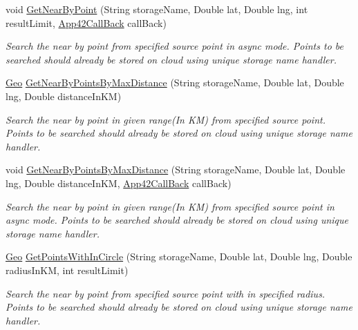 \begin{DoxyCompactItemize}
void \hyperlink{classcom_1_1shephertz_1_1app42_1_1paas_1_1sdk_1_1csharp_1_1geo_1_1_geo_service_ab7110e080306922cc589d7c8451874aa}{Get\+Near\+By\+Point} (String storage\+Name, Double lat, Double lng, int result\+Limit, \hyperlink{interfacecom_1_1shephertz_1_1app42_1_1paas_1_1sdk_1_1csharp_1_1_app42_call_back}{App42\+Call\+Back} call\+Back)
\begin{DoxyCompactList}\small\item\em Search the near by point from specified source point in async mode. Points to be searched should already be stored on cloud using unique storage name handler. \end{DoxyCompactList}\item 
\hyperlink{classcom_1_1shephertz_1_1app42_1_1paas_1_1sdk_1_1csharp_1_1geo_1_1_geo}{Geo} \hyperlink{classcom_1_1shephertz_1_1app42_1_1paas_1_1sdk_1_1csharp_1_1geo_1_1_geo_service_a678117e4463bddada386741ff4a87d2f}{Get\+Near\+By\+Points\+By\+Max\+Distance} (String storage\+Name, Double lat, Double lng, Double distance\+In\+K\+M)
\begin{DoxyCompactList}\small\item\em Search the near by point in given range(\+In K\+M) from specified source point. Points to be searched should already be stored on cloud using unique storage name handler. \end{DoxyCompactList}\item 
void \hyperlink{classcom_1_1shephertz_1_1app42_1_1paas_1_1sdk_1_1csharp_1_1geo_1_1_geo_service_aa7efc8336dabcd57f921793ebff2311f}{Get\+Near\+By\+Points\+By\+Max\+Distance} (String storage\+Name, Double lat, Double lng, Double distance\+In\+K\+M, \hyperlink{interfacecom_1_1shephertz_1_1app42_1_1paas_1_1sdk_1_1csharp_1_1_app42_call_back}{App42\+Call\+Back} call\+Back)
\begin{DoxyCompactList}\small\item\em Search the near by point in given range(\+In K\+M) from specified source point in async mode. Points to be searched should already be stored on cloud using unique storage name handler. \end{DoxyCompactList}\item 
\hyperlink{classcom_1_1shephertz_1_1app42_1_1paas_1_1sdk_1_1csharp_1_1geo_1_1_geo}{Geo} \hyperlink{classcom_1_1shephertz_1_1app42_1_1paas_1_1sdk_1_1csharp_1_1geo_1_1_geo_service_a039fa0eeb236e8dca7c74853283ea33b}{Get\+Points\+With\+In\+Circle} (String storage\+Name, Double lat, Double lng, Double radius\+In\+K\+M, int result\+Limit)
\begin{DoxyCompactList}\small\item\em Search the near by point from specified source point with in specified radius. Points to be searched should already be stored on cloud using unique storage name handler. \end{DoxyCompactList}\item 

\end{DoxyCompactItemize}
